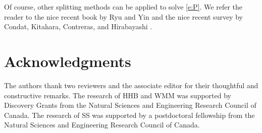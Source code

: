 \documentclass{article}
\begin{document}
Of course, other splitting methods can be applied to solve \cref{e:P}. 
We refer the reader to the nice recent book by 
Ryu and Yin \cite{RyuYin} and the nice recent survey 
by Condat, Kitahara, Contreras, and Hirabayashi \cite{Condat}. 

\section*{Acknowledgments}
{ The authors thank two reviewers and the associate
editor 
for their thoughtful and constructive remarks.}
The research of HHB and WMM was supported by Discovery Grants from 
the Natural Sciences and Engineering Research Council of Canada. 
The research of SS was supported by a postdoctoral fellowship from the Natural Sciences and Engineering Research Council of Canada. 
\end{document}
